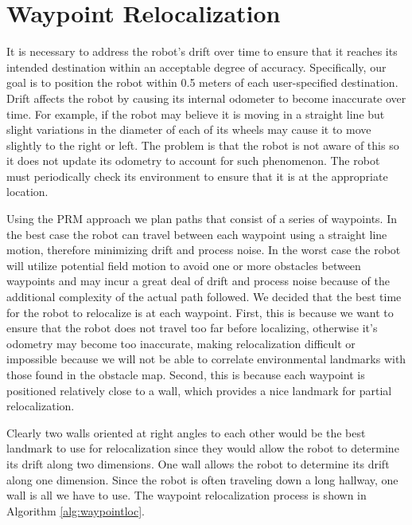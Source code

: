 \documentclass[12pt]{article}
\begin{document}
\section{Waypoint Relocalization}
\label{sec:waypointreloc}

It is necessary to address the robot's drift over time to ensure that it reaches its intended destination within an acceptable degree of accuracy. Specifically, our goal is to position the robot within 0.5 meters of each user-specified destination. Drift affects the robot by causing its internal odometer to become inaccurate over time. For example, if the robot may believe it is moving in a straight line but slight variations in the diameter of each of its wheels may cause it to move slightly to the right or left. The problem is that the robot is not aware of this so it does not update its odometry to account for such phenomenon. The robot must periodically check its environment to ensure that it is at the appropriate location. 

Using the PRM approach we plan paths that consist of a series of waypoints. In the best case the robot can travel between each waypoint using a straight line motion, therefore minimizing drift and process noise. In the worst case the robot will utilize potential field motion to avoid one or more obstacles between waypoints and may incur a great deal of drift and process noise because of the additional complexity of the actual path followed. We decided that the best time for the robot to relocalize is at each waypoint. First, this is because we want to ensure that the robot does not travel too far before localizing, otherwise it's odometry may become too inaccurate, making relocalization difficult or impossible because we will not be able to correlate environmental landmarks with those found in the obstacle map. Second, this is because each waypoint is positioned relatively close to a wall, which provides a nice landmark for partial relocalization. 

Clearly two walls oriented at right angles to each other would be the best landmark to use for relocalization since they would allow the robot to determine its drift along two dimensions. One wall allows the robot to determine its drift along one dimension. Since the robot is often traveling down a long hallway, one wall is all we have to use. The waypoint relocalization process is shown in Algorithm \ref{alg:waypointloc}.
\end{document}
